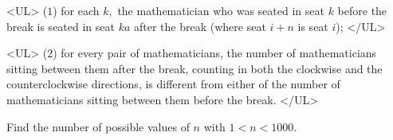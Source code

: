 \documentclass{article}
\begin{document}
\begin{enumerate}[label=\arabic*., itemsep=0.5em]
<UL>
($1$) for each $k,$ the mathematician who was seated in seat $k$ before the break is seated in seat $ka$ after the break (where seat $i + n$ is seat $i$);
</UL>

<UL>
($2$) for every pair of mathematicians, the number of mathematicians sitting between them after the break, counting in both the clockwise and the counterclockwise directions, is different from either of the number of mathematicians sitting between them before the break.
</UL>

Find the number of possible values of $n$ with $1 < n < 1000.$\par \vspace{0.5em}\end{enumerate}
\end{document}
